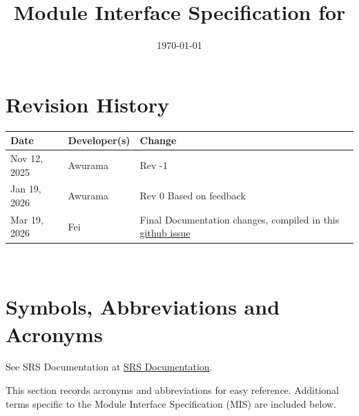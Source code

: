 \documentclass[12pt, titlepage]{article}
\begin{document}
\title{Module Interface Specification for \progname{}}

\author{\authname}

\date{\today}

\maketitle


\section{Revision History}

\begin{tabularx}{\textwidth}{p{3cm}p{3cm}X}
\toprule {\bf Date} & {\bf Developer(s)} & {\bf Change}\\
\midrule
Nov 12, 2025 & Awurama & Rev -1\\
Jan 19, 2026 & Awurama & Rev 0 Based on feedback\\
Mar 19, 2026 & Fei & Final Documentation changes, compiled in this \href{https://github.com/thaafei/DomainX/issues/501}{github issue} \\
\bottomrule
\end{tabularx}

~\newpage

\section{Symbols, Abbreviations and Acronyms}

See SRS Documentation at
\href{https://github.com/thaafei/DomainX/blob/main/docs/SRS/SRS.pdf}{SRS Documentation}.

This section records acronyms and abbreviations for easy reference.
Additional terms specific to the Module Interface Specification (MIS) are included below.
\end{document}
